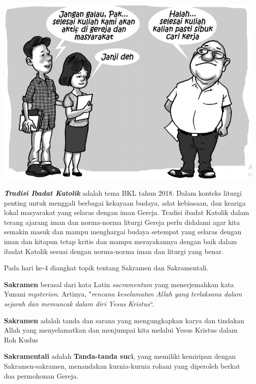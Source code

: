 \begin{floatingfigure}[l]{5cm}
	\begin{center}
		\includegraphics[scale=0.25]{BKL-2018-hari-1.png}
	\end{center}
\end{floatingfigure}

 \textit{\textbf{Tradisi Ibadat Katolik}} adalah tema BKL tahun 2018. Dalam konteks liturgi penting untuk menggali berbagai kekayaan budaya, adat kebiasaan, dan keariga lokal masyarakat yang selaras dengan iman Gereja. Tradisi ibadat Katolik dalam terang ajarang iman dan norma-norma liturgi Gereja perlu didalami agar kita semakin masuk dan mampu menghargai budaya setempat yang selaras dengan iman dan kitapun tetap kritis dan mampu merayakannya dengan baik dalam ibadat Katolik sesuai dengan norma-norma iman dan liturgi yang benar.

Pada hari ke-4 diangkat topik tentang Sakramen dan Sakramentali.

\textbf{Sakramen} berasal dari kata Latin \textit{sacramentum} yang
menerjemahkan   kata Yunani \textit{mysterion}.   Artinya,
"\textit{rencana keselamatan Allah yang terlaksana dalam
sejarah dan memuncak dalam diri Yesus Kristus}“.

\textbf{Sakramen} adalah tanda dan sarana yang
mengungkapkan karya dan tindakan Allah yang
menyelamatkan dan menjumpai kita melalui Yesus
Kristus dalam Roh Kudus

\textbf{Sakramentali} adalah \textbf{Tanda-tanda suci}, yang memiliki kemiripan dengan Sakramen-sakramen,     menandakan     kurnia-kurnia rohani yang diperoleh berkat doa
permohonan Gereja.

